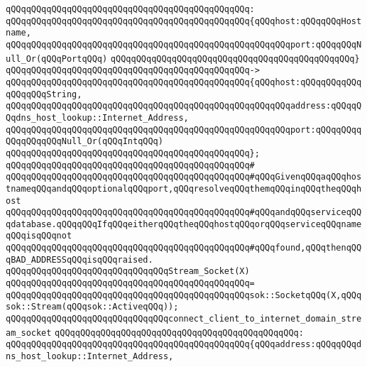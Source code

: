 \verb|qQQqqQQqqQQqqQQqqQQqqQQqqQQqqQQqqQQqqQQqqQQqqQQq:|\newline
\verb|qQQqqQQqqQQqqQQqqQQqqQQqqQQqqQQqqQQqqQQqqQQqqQQq{qQQqhost:qQQqqQQqHostname,|\newline
\verb|qQQqqQQqqQQqqQQqqQQqqQQqqQQqqQQqqQQqqQQqqQQqqQQqqQQqqQQqport:qQQqqQQqNull_Or(qQQqPortqQQq)|\newline
\verb|qQQqqQQqqQQqqQQqqQQqqQQqqQQqqQQqqQQqqQQqqQQqqQQq}|\newline
\verb|qQQqqQQqqQQqqQQqqQQqqQQqqQQqqQQqqQQqqQQqqQQqqQQq->|\newline
\verb|qQQqqQQqqQQqqQQqqQQqqQQqqQQqqQQqqQQqqQQqqQQqqQQq{qQQqhost:qQQqqQQqqQQqqQQqqQQqString,|\newline
\verb|qQQqqQQqqQQqqQQqqQQqqQQqqQQqqQQqqQQqqQQqqQQqqQQqqQQqqQQqaddress:qQQqqQQqdns_host_lookup::Internet_Address,|\newline
\verb|qQQqqQQqqQQqqQQqqQQqqQQqqQQqqQQqqQQqqQQqqQQqqQQqqQQqqQQqport:qQQqqQQqqQQqqQQqqQQqNull_Or(qQQqIntqQQq)|\newline
\verb|qQQqqQQqqQQqqQQqqQQqqQQqqQQqqQQqqQQqqQQqqQQqqQQq};|\newline
\verb|qQQqqQQqqQQqqQQqqQQqqQQqqQQqqQQqqQQqqQQqqQQqqQQq#|\newline
\verb|qQQqqQQqqQQqqQQqqQQqqQQqqQQqqQQqqQQqqQQqqQQqqQQq#qQQqGivenqQQqaqQQqhostnameqQQqandqQQqoptionalqQQqport,qQQqresolveqQQqthemqQQqinqQQqtheqQQqhost|\newline
\verb|qQQqqQQqqQQqqQQqqQQqqQQqqQQqqQQqqQQqqQQqqQQqqQQq#qQQqandqQQqserviceqQQqdatabase.qQQqqQQqIfqQQqeitherqQQqtheqQQqhostqQQqorqQQqserviceqQQqnameqQQqisqQQqnot|\newline
\verb|qQQqqQQqqQQqqQQqqQQqqQQqqQQqqQQqqQQqqQQqqQQqqQQq#qQQqfound,qQQqthenqQQqBAD_ADDRESSqQQqisqQQqraised.|\newline
\newline
\newline
\verb|qQQqqQQqqQQqqQQqqQQqqQQqqQQqqQQqStream_Socket(X)|\newline
\verb|qQQqqQQqqQQqqQQqqQQqqQQqqQQqqQQqqQQqqQQqqQQqqQQq=|\newline
\verb|qQQqqQQqqQQqqQQqqQQqqQQqqQQqqQQqqQQqqQQqqQQqqQQqsok::SocketqQQq(X,qQQqsok::Stream(qQQqsok::ActiveqQQq));|\newline
\newline
\verb|qQQqqQQqqQQqqQQqqQQqqQQqqQQqqQQqconnect_client_to_internet_domain_stream_socket|\newline
\verb|qQQqqQQqqQQqqQQqqQQqqQQqqQQqqQQqqQQqqQQqqQQqqQQq:|\newline
\verb|qQQqqQQqqQQqqQQqqQQqqQQqqQQqqQQqqQQqqQQqqQQqqQQq{qQQqaddress:qQQqqQQqdns_host_lookup::Internet_Address,|\newline
